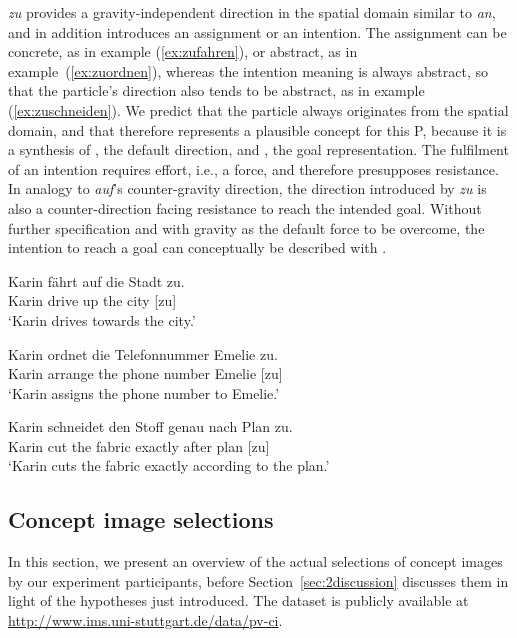 \documentclass[output=paper]{langsci/langscibook}
\begin{document}
\textit{zu} provides a gravity-independent direction in the spatial
domain similar to \textit{an}, and in addition introduces an
assignment or an intention. The assignment can be concrete, as in
example (\ref{ex:zufahren}), or abstract, as in
example~(\ref{ex:zuordnen}), whereas the intention meaning is always
abstract, so that the particle's direction also tends to be abstract,
as in example (\ref{ex:zuschneiden}). We predict that the particle
always originates from the spatial domain, and that
 therefore represents a plausible concept for
this P, because it is a synthesis of , the default
direction, and , the goal representation. The
fulfilment of an intention requires effort, i.e., a force, and
therefore presupposes resistance. In analogy to \textit{auf}'s
counter-gravity direction, the direction introduced by \textit{zu} is
also a counter-direction facing resistance to reach the intended
goal. Without further specification and with gravity as the default
force to be overcome, the intention to reach a goal can conceptually
be described with .

\ea\label{ex:zufahren}
\gll Karin fährt auf die Stadt zu.\\
Karin drive up the city [zu]\\
\glt `Karin drives towards the city.'
\z

\ea\label{ex:zuordnen}
\gll Karin ordnet die Telefonnummer Emelie zu.\\
Karin arrange the {phone number} Emelie [zu]\\
\glt `Karin assigns the phone number to Emelie.'
\z

\ea\label{ex:zuschneiden}
\gll Karin schneidet den Stoff genau nach Plan zu.\\
Karin cut the fabric exactly after plan [zu]\\
\glt `Karin cuts the fabric exactly according to the plan.'
\z

\subsection{Concept image selections}

In this section, we present an overview of the actual selections of
concept images by our experiment participants, before
Section~\ref{sec:2discussion} discusses them in light of the hypotheses
just introduced. The dataset is publicly available at
\url{http://www.ims.uni-stuttgart.de/data/pv-ci}.
\end{document}
